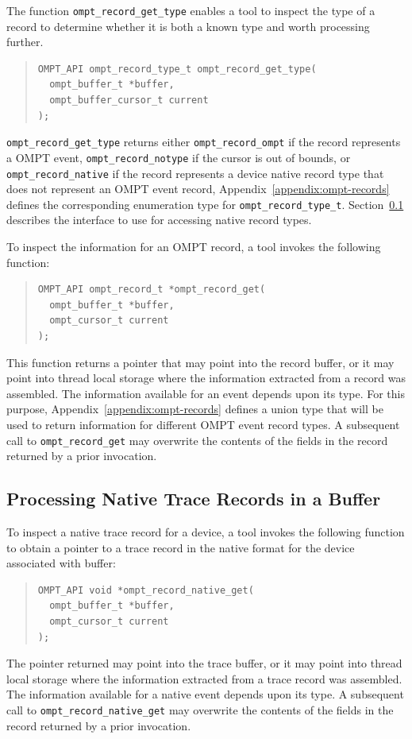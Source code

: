 \documentclass{article}
\begin{document}
The function \verb|ompt_record_get_type| enables a tool to inspect the type of a record to determine whether it is both a known type and worth processing further. 
\begin{quote}
\begin{verbatim}
OMPT_API ompt_record_type_t ompt_record_get_type(
  ompt_buffer_t *buffer, 
  ompt_buffer_cursor_t current
);
\end{verbatim}
\end{quote}
\verb|ompt_record_get_type| returns either \verb|ompt_record_ompt| if the record represents a OMPT event, \verb|ompt_record_notype| if the cursor is out of bounds, or  \verb|ompt_record_native| if the record represents a device native record type that does not represent an OMPT event record, Appendix~\ref{appendix:ompt-records} defines the corresponding enumeration type for \verb|ompt_record_type_t|. 
Section~\ref{sec:native-record-data} describes the interface to use for accessing native record types.
 

To inspect the information for an OMPT record, a tool invokes the following function:
\begin{quote}
\begin{verbatim}
OMPT_API ompt_record_t *ompt_record_get(
  ompt_buffer_t *buffer, 
  ompt_cursor_t current
);
\end{verbatim}
\end{quote}
This function returns a pointer that may point into the record buffer, or it may point into thread local storage where the information extracted from a record was assembled. The information available for an event depends upon its type. For this purpose, Appendix~\ref{appendix:ompt-records} defines a union type that will be used to return information for different OMPT event record types. A subsequent call to \verb|ompt_record_get| may overwrite the contents of the fields in the record returned by a prior invocation.

\subsection{Processing Native Trace Records in a Buffer}
\label{sec:native-record-data}

To inspect a native trace record for a device, a tool invokes the following function to obtain a pointer to a trace record in the native format for the device associated with buffer:
\begin{quote}
\begin{verbatim}
OMPT_API void *ompt_record_native_get(
  ompt_buffer_t *buffer, 
  ompt_cursor_t current
);
\end{verbatim}
\end{quote}
The pointer returned  may point into the trace buffer, or it may point into thread local storage where the information extracted from a trace record was assembled. The information available for a native event depends upon its type. 
A subsequent call to \verb|ompt_record_native_get| may overwrite the contents of the fields in the record returned by a prior invocation.
\end{document}
